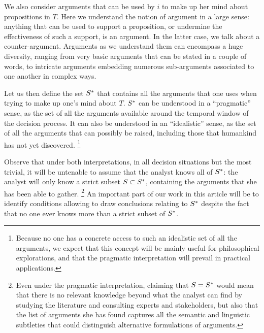 \documentclass[smallextended,nospthms, natbib]{svjour3}
\begin{document}
We also consider arguments that can be used by $i$ to make up her mind about propositions in $T$. 
Here we understand the notion of argument in a large sense: anything that can be used to support a proposition, or undermine the effectiveness of such a support, is an argument. In the latter case, we talk about a counter-argument. Arguments as we understand them can encompass a huge diversity, ranging from very basic arguments that can be stated in a couple of words, to intricate arguments embedding numerous sub-arguments associated to one another in complex ways.

Let us then define the set $S^*$ that contains all the arguments that one uses when trying to make up one’s mind about $T$. 
$S^*$ can be understood in a “pragmatic” sense, as the set of all the arguments available around the temporal window of the decision process. It can also be understood in an “idealistic” sense, as the set of all the arguments that can possibly be raised, including those that humankind has not yet discovered.%
\footnote{Because no one has a concrete access to such an idealistic set of all the arguments, we expect that this concept will be mainly useful for philosophical explorations, and that the pragmatic interpretation will prevail in practical applications.}

Observe that under both interpretations, in all decision situations but the most trivial, it will be untenable to assume that the analyst knows all of $S^*$: the analyst will only know a strict subset $S \subset S^*$, containing the arguments that she has been able to gather.%
\footnote{Even under the pragmatic interpretation, claiming that $S = S^*$ would mean that there is no relevant knowledge beyond what the analyst can find by studying the literature and consulting experts and stakeholders, but also that the list of arguments she has found captures all the semantic and linguistic subtleties that could distinguish alternative formulations of arguments.}
An important part of our work in this article will be to identify conditions allowing to draw conclusions relating to $S^*$ despite the fact that no one ever knows more than a strict subset of $S^*$. 
\end{document}
